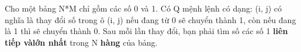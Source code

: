Cho một bảng N*M chỉ gồm các số 0 và 1. Có Q mệnh lệnh có dạng: (i, j) có nghĩa là thay đổi số trong ô (i, j) nếu đang từ 0 sẽ chuyển thành 1, còn nếu đang là 1 thì sẽ chuyển thành 0. Sau mỗi lần thay đổi, bạn phải tìm số các số 1 \textbf{liên tiếp và}\textbf{lớn nhất} trong N \textbf{hàng} của bảng.